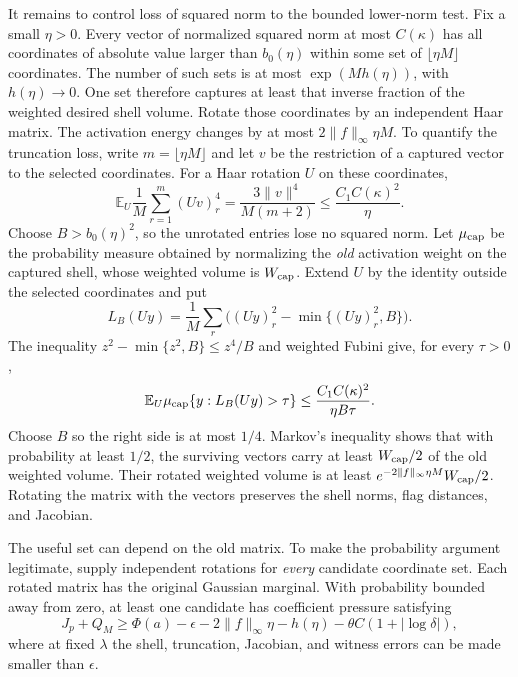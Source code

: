 \documentclass[11pt]{article}
\numberwithin{equation}{section}
\theoremstyle{definition}
\newcommand{\E}{\mathbb E}
\newcommand{\norm}[1]{\lVert #1\rVert}
\begin{document}
It remains to control loss of squared norm to the bounded lower-norm test. Fix a small $\eta>0$. Every vector of normalized squared norm at most $C(\kappa)$ has all coordinates of absolute value larger than $b_0(\eta)$ within some set of $\lfloor\eta M\rfloor$ coordinates. The number of such sets is at most $\exp(Mh(\eta))$, with $h(\eta)\to0$. One set therefore captures at least that inverse fraction of the weighted desired shell volume. Rotate those coordinates by an independent Haar matrix. The activation energy changes by at most $2\norm f_\infty\eta M$. To quantify the truncation loss, write $m=\lfloor\eta M\rfloor$ and let $v$ be the restriction of a captured vector to the selected coordinates. For a Haar rotation $U$ on these coordinates,
\[
\E_U\frac1M\sum_{r=1}^{m}(Uv)_r^4
=\frac{3\norm v^4}{M(m+2)}
\le\frac{C_1C(\kappa)^2}{\eta}.
\]
Choose $B>b_0(\eta)^2$, so the unrotated entries lose no squared norm. Let $\mu_{\rm cap}$ be the probability measure obtained by normalizing the \emph{old} activation weight on the captured shell, whose weighted volume is $W_{\rm cap}$. Extend $U$ by the identity outside the selected coordinates and put
\[
L_B(Uy)=\frac1M\sum_r\big((Uy)_r^2-\min\{(Uy)_r^2,B\}\big).
\]
The inequality $z^2-\min\{z^2,B\}\le z^4/B$ and weighted Fubini give, for every $\tau>0$,
\[
\E_U\mu_{\rm cap}\{y:L_B(Uy)>\tau\}
\le\frac{C_1C(\kappa)^2}{\eta B\tau}.
\]
Choose $B$ so the right side is at most $1/4$. Markov's inequality shows that with probability at least $1/2$, the surviving vectors carry at least $W_{\rm cap}/2$ of the old weighted volume. Their rotated weighted volume is at least $e^{-2\norm f_\infty\eta M}W_{\rm cap}/2$. Rotating the matrix with the vectors preserves the shell norms, flag distances, and Jacobian.

The useful set can depend on the old matrix. To make the probability argument legitimate, supply independent rotations for \emph{every} candidate coordinate set. Each rotated matrix has the original Gaussian marginal. With probability bounded away from zero, at least one candidate has coefficient pressure satisfying
\begin{equation}\label{eq:lowerwitness}
J_p+Q_M\ge\Phi(a)-\epsilon
-2\norm f_\infty\eta-h(\eta)
-\theta C(1+|\log\delta|),
\end{equation}
where at fixed $\lambda$ the shell, truncation, Jacobian, and witness errors can be made smaller than $\epsilon$.
\end{document}
